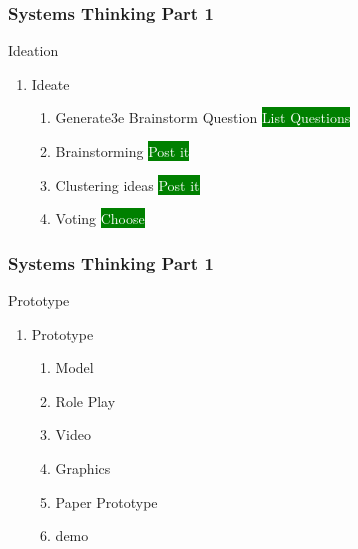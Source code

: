 \newpage
\begin{frame}
\frametitle{Systems Thinking  Part 1 }
\begin{block}{Ideation  }

\begin{enumerate}[4]

    \item Ideate
     \begin{enumerate}
         \item Generate3e Brainstorm Question   \colorbox{green}{ \textcolor{white}{ List Questions } }
         \item Brainstorming   \colorbox{green}{ \textcolor{white}{ Post it } }
         \item Clustering ideas   \colorbox{green}{ \textcolor{white}{ Post it } }
         \item Voting  \colorbox{green}{ \textcolor{white}{ Choose } }
     \end{enumerate}
 
\end{enumerate}

\end{block}
\end{frame}


\newpage
\begin{frame}
\frametitle{ Systems Thinking  Part 1 }
\begin{block}{Prototype  }

\begin{enumerate}[5]

    \item Prototype
     \begin{enumerate}
         \item Model 
         \item Role Play 
         \item Video
         \item  Graphics
         \item Paper Prototype
         \item  demo
     \end{enumerate}
 
\end{enumerate}

\end{block}
\end{frame}


\newpage



